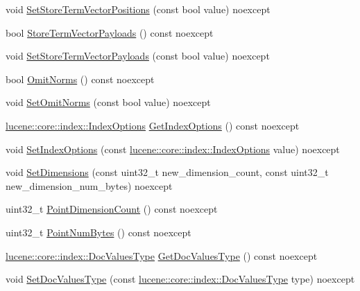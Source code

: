 \begin{DoxyCompactItemize}
\item 
void \mbox{\hyperlink{classlucene_1_1core_1_1document_1_1FieldType_aaefba2c5e643161bbaeaa297ea1121fa}{Set\+Store\+Term\+Vector\+Positions}} (const bool value) noexcept
\item 
bool \mbox{\hyperlink{classlucene_1_1core_1_1document_1_1FieldType_aba23cb0e0fc850b1958c9fbd1997c1a9}{Store\+Term\+Vector\+Payloads}} () const noexcept
\item 
void \mbox{\hyperlink{classlucene_1_1core_1_1document_1_1FieldType_a57615db669cf727ed97701df05df6e84}{Set\+Store\+Term\+Vector\+Payloads}} (const bool value) noexcept
\item 
bool \mbox{\hyperlink{classlucene_1_1core_1_1document_1_1FieldType_adf65107f5dfea8171b284e14bc7344f5}{Omit\+Norms}} () const noexcept
\item 
void \mbox{\hyperlink{classlucene_1_1core_1_1document_1_1FieldType_ad1a9c9763e28363d3acd146a0fdd8e07}{Set\+Omit\+Norms}} (const bool value) noexcept
\item 
\mbox{\hyperlink{namespacelucene_1_1core_1_1index_a0d5e1f98471a76de106056cf3b5a7897}{lucene\+::core\+::index\+::\+Index\+Options}} \mbox{\hyperlink{classlucene_1_1core_1_1document_1_1FieldType_ae51c6c54d9992fbe3102715ff94778ec}{Get\+Index\+Options}} () const noexcept
\item 
void \mbox{\hyperlink{classlucene_1_1core_1_1document_1_1FieldType_a915acc2ea4cb0ca7edce3f629d83158e}{Set\+Index\+Options}} (const \mbox{\hyperlink{namespacelucene_1_1core_1_1index_a0d5e1f98471a76de106056cf3b5a7897}{lucene\+::core\+::index\+::\+Index\+Options}} value) noexcept
\item 
void \mbox{\hyperlink{classlucene_1_1core_1_1document_1_1FieldType_a17e71a728e6e6ec2271ec9a2f4fc7398}{Set\+Dimensions}} (const uint32\+\_\+t new\+\_\+dimension\+\_\+count, const uint32\+\_\+t new\+\_\+dimension\+\_\+num\+\_\+bytes) noexcept
\item 
uint32\+\_\+t \mbox{\hyperlink{classlucene_1_1core_1_1document_1_1FieldType_ad9774147fe3ca9abf5f66870e4083363}{Point\+Dimension\+Count}} () const noexcept
\item 
uint32\+\_\+t \mbox{\hyperlink{classlucene_1_1core_1_1document_1_1FieldType_af4b18f524ccaa560b6ba667f153c5880}{Point\+Num\+Bytes}} () const noexcept
\item 
\mbox{\hyperlink{namespacelucene_1_1core_1_1index_a2f7ffaef6429b5df542c8aa12f8b9883}{lucene\+::core\+::index\+::\+Doc\+Values\+Type}} \mbox{\hyperlink{classlucene_1_1core_1_1document_1_1FieldType_ac5b53a2d9ebbb926199f9e2f58dc0537}{Get\+Doc\+Values\+Type}} () const noexcept
\item 
void \mbox{\hyperlink{classlucene_1_1core_1_1document_1_1FieldType_a703c8ceafd844b1e36d0e0a907465bc5}{Set\+Doc\+Values\+Type}} (const \mbox{\hyperlink{namespacelucene_1_1core_1_1index_a2f7ffaef6429b5df542c8aa12f8b9883}{lucene\+::core\+::index\+::\+Doc\+Values\+Type}} type) noexcept
\end{DoxyCompactItemize}

